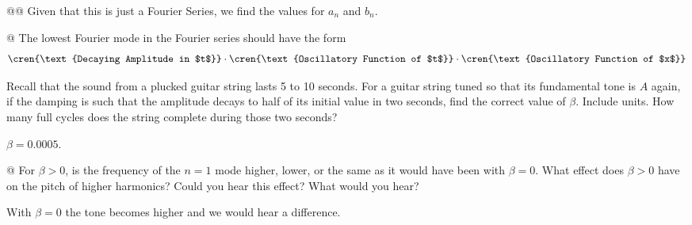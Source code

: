 \documentclass[10pt]{article}
\begin{document}
\begin{easylist}[enumerate]

    @@ Given that this is just a Fourier Series, we find the values for $a_n$ and $b_n$.


    @ The lowest Fourier mode in the Fourier series should have the form
    \[
        \cren{\text{Decaying Amplitude in $t$}} \cdot
        \cren{\text{Oscillatory Function of $t$}} \cdot
        \cren{\text{Oscillatory Function of $x$}}
    \]

    Recall that the sound from a plucked guitar string lasts 5 to 10 seconds. For a guitar string tuned so that its
    fundamental tone is $A$ again, if the damping is such that the amplitude decays to half of its initial value in two
    seconds, find the correct value of $\beta$. Include units. How many full cycles does the string complete during
    those two seconds?

    $\beta = 0.0005$.

    @ For $\beta > 0$, is the frequency of the $n = 1$ mode higher, lower, or the same as it would have been with
    $\beta=0$. What effect does $\beta > 0$ have on the pitch of higher harmonics? Could you hear this effect? What
    would you hear?

    With $\beta = 0$ the tone becomes higher and we would hear a difference.
\end{easylist}
\end{document}
